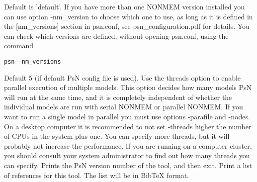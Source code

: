 \begin{optionlist}
Default is 'default'. 
If you have more than one NONMEM version installed you can use option
-nm\_version to choose which one to use, as long as it is 
defined in the [nm\_versions] section in psn.conf, see psn\_configuration.pdf for details. 
You can check which versions are defined, without opening psn.conf, using the command
\begin{verbatim}
psn -nm_versions
\end{verbatim}
\nextopt
{}
Default 5 (if default PsN config file is used). 
Use the threads option to enable parallel execution of multiple models.
This option decides how many models PsN will run at the same time, and it is completely
independent of whether the individual models are run with serial NONMEM or parallel NONMEM.
If you want to run a single model in parallel you must use options -parafile and -nodes.
On a desktop computer it 
is recommended to not set -threads higher the number of CPUs in the system plus one. 
You can specify more threads, 
but it will probably not increase the performance. If you are running on a computer cluster, 
you should consult your 
system administrator to find out how many threads you can specify. 
\nextopt
{}
Prints the PsN version number of the tool, and then exit. 
\nextopt
{}
Print a list of references for this tool. The list will be in BibTeX format.
\nextopt
\end{optionlist}
